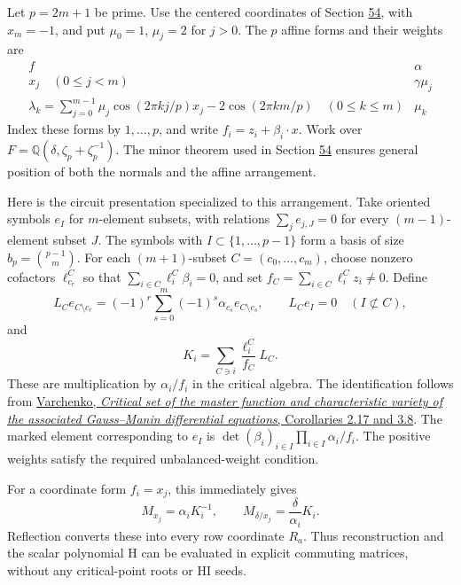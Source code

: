 \documentclass[11pt,reqno]{amsart}
\theoremstyle{plain}
\begin{document}
Let \(p=2m+1\) be prime. Use the centered coordinates of Section \hyperref[sec:54]{54},
with \(x_m=-1\), and put \(\mu_0=1\), \(\mu_j=2\) for \(j>0\).
The \(p\) affine forms and their weights are
\begin{equation*}
 \begin{array}{c|c}
 f&\alpha\\ \hline
 x_j\quad(0\le j<m)&\gamma\mu_j\\
 \lambda_k=\displaystyle\sum_{j=0}^{m-1}
   \mu_j\cos(2\pi kj/p)x_j-2\cos(2\pi km/p)
   \quad(0\le k\le m)&\mu_k
 \end{array}
 \tag{57.1}
\end{equation*}
Index these forms by \(1,\ldots,p\), and write
\(f_i=z_i+\beta_i\cdot x\). Work over
\(F=\mathbb Q(\delta,\zeta_p+\zeta_p^{-1})\).
The minor theorem used in Section \hyperref[sec:54]{54} ensures general position of both
the normals and the affine arrangement.

Here is the circuit presentation specialized to this arrangement. Take
oriented symbols \(e_I\) for \(m\)-element subsets, with relations
\(\sum_j e_{j,J}=0\) for every \((m-1)\)-element subset \(J\).
The symbols with \(I\subset\{1,\ldots,p-1\}\) form a basis of size
\(b_p=\binom{p-1}{m}\). For each \((m+1)\)-subset
\(C=(c_0,\ldots,c_m)\), choose nonzero cofactors \(\ell^C_{c_r}\)
so that \(\sum_{i\in C}\ell^C_i\beta_i=0\), and set
\(f_C=\sum_{i\in C}\ell^C_i z_i\ne0\). Define
\[
 L_C e_{C\setminus c_r}
   =(-1)^r\sum_{s=0}^{m}(-1)^s\alpha_{c_s}e_{C\setminus c_s},
 \qquad L_C e_I=0\quad(I\not\subset C),
\]
and
\begin{equation*}
 \boxed{K_i=\sum_{C\ni i}\frac{\ell_i^C}{f_C}L_C.}
 \tag{57.2}
\end{equation*}
These are multiplication by \(\alpha_i/f_i\) in the critical algebra.
The identification follows from \href{https://armj.math.stonybrook.edu/html-articles/Files-2015-2024/15-20/}{Varchenko, \emph{Critical set of the master
function and characteristic variety of the associated Gauss--Manin
differential equations}, Corollaries 2.17 and 3.8}.
The marked element corresponding to \(e_I\) is
\(\det(\beta_i)_{i\in I}\prod_{i\in I}\alpha_i/f_i\).
The positive weights satisfy the required unbalanced-weight condition.

For a coordinate form \(f_i=x_j\), this immediately gives
\begin{equation*}
 M_{x_j}=\alpha_iK_i^{-1},\qquad
 M_{\delta/x_j}=\frac{\delta}{\alpha_i}K_i.
 \tag{57.3}
\end{equation*}
Reflection converts these into every row coordinate \(R_a\).
Thus reconstruction and the scalar polynomial H can be evaluated in
explicit commuting matrices, without any critical-point roots or HI seeds.
\end{document}
